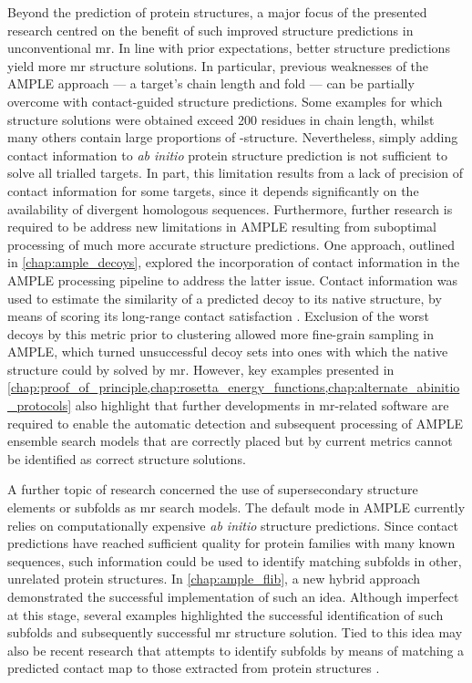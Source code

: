 Beyond the prediction of protein structures, a major focus of the presented research centred on the benefit of such improved structure predictions in unconventional \gls{mr}. In line with prior expectations, better structure predictions yield more \gls{mr} structure solutions. In particular, previous weaknesses of the AMPLE approach --- a target's chain length and fold --- can be partially overcome with contact-guided structure predictions. Some examples for which structure solutions were obtained exceed 200 residues in chain length, whilst many others contain large proportions of \textbeta-structure. Nevertheless, simply adding contact information to \textit{ab initio} protein structure prediction is not sufficient to solve all trialled targets. In part, this limitation results from a lack of precision of contact information for some targets, since it depends significantly on the availability of divergent homologous sequences. Furthermore, further research is required to be address new limitations in AMPLE resulting from suboptimal processing of much more accurate structure predictions. One approach, outlined in \cref{chap:ample_decoys}, explored the incorporation of contact information in the AMPLE processing pipeline to address the latter issue. Contact information was used to estimate the similarity of a predicted decoy to its native structure, by means of scoring its long-range contact satisfaction \cite{Kosciolek2014-bt,De_Oliveira2017-gj,Adhikari2018-lj}. Exclusion of the worst decoys by this metric prior to clustering allowed more fine-grain sampling in AMPLE, which turned unsuccessful decoy sets into ones with which the native structure could by solved by \gls{mr}. However, key examples presented in \cref{chap:proof_of_principle,chap:rosetta_energy_functions,chap:alternate_abinitio_protocols} also highlight that further developments in \gls{mr}-related software are required to enable the automatic detection and subsequent processing of AMPLE ensemble search models that are correctly placed but by current metrics cannot be identified as correct structure solutions.

A further topic of research concerned the use of supersecondary structure elements or subfolds as \gls{mr} search models. The default mode in AMPLE currently relies on computationally expensive \textit{ab initio} structure predictions. Since contact predictions have reached sufficient quality for protein families with many known sequences, such information could be used to identify matching subfolds in other, unrelated protein structures. In \cref{chap:ample_flib}, a new hybrid approach demonstrated the successful implementation of such an idea. Although imperfect at this stage, several examples highlighted the successful identification of such subfolds and subsequently successful \gls{mr} structure solution. Tied to this idea may also be recent research that attempts to identify subfolds by means of matching a predicted contact map to those extracted from protein structures \cite{Buchan2017-ox,Ovchinnikov2017-nd}. 

